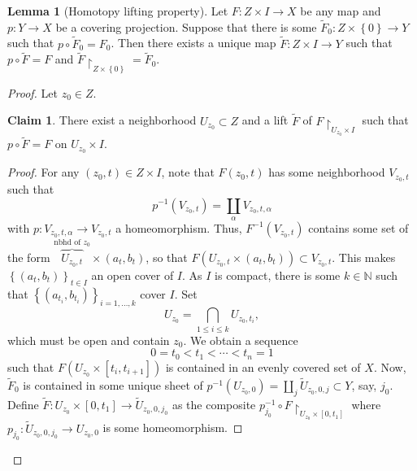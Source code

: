 \documentclass[10pt,letterpaper,cm]{nupset}
\theoremstyle{definition}
\theoremstyle{theorem}
\newtheorem{lemma}[definition]{Lemma}
\newtheorem*{claim}{Claim}
\theoremstyle{remark}
\newcommand{\N}{\mathbb N}
\newcommand{\1}{\mathbb{1}}
\newcommand{\0}{\vec 0}
\begin{document}
\begin{lemma}[Homotopy lifting property]\label{HLP}
Let $F : Z \times I \to X$ be any map and $p: Y \to X$ be a covering projection. Suppose that there is some $\widetilde{F}_0 : Z \times \left\{0\right\} \to Y$ such that $p \circ \widetilde{F}_0 = F_0$. Then there exists a unique map $\widetilde{F} : Z \times I \to Y$ such that $p \circ \widetilde{F} = F$ and $\widetilde{F} \restriction_{Z\times \left\{0\right\}} = \widetilde{F}_0$.
\end{lemma}
\begin{proof}
Let $z_0\in Z$.
\begin{claim} There exist a neighborhood $U_{z_0}\subset Z$ and a lift $\widetilde{F}$ of $F\restriction_{U_{z_0}\times I}$ such that $p \circ \widetilde{F} = F$ on $U_{z_0}\times I$.
\end{claim}
\begin{proof}
For any $\left(z_0, t\right) \in Z \times I$, note that $F(z_0, t)$ has some neighborhood $V_{z_0,t}$ such that $$p^{-1}(V_{z_0, t}) = \coprod_{\alpha} V_{z_0,t, \alpha}$$ with $p: V_{z_0, t, \alpha} \to V_{z_0, t}$ a homeomorphism. Thus, $F^{-1}(V_{z_0, t})$ contains some set of the form $\overbrace{U_{z_0, t}}^{\text{nbhd of } z_0} \times \left(a_t, b_t\right)$, so that $F(U_{z_0, t}  \times (a_t, b_t)) \subset V_{z_0, t} $. This makes $\left\{\left(a_t, b_t\right)\right\}_{t\in I}$ an open cover of $I$. As $I$ is compact, there is some $k\in \N$ such that $\left\{(a_{t_i}, b_{t_i})\right\}_{i=1, \ldots, k}$  cover $I$. Set $$U_{z_0} = \bigcap_{1\leq i \leq k} U_{z_0, t_i},$$ which must be  open and contain $z_0$. We obtain a sequence $$ 0= t_0 < t_1 < \cdots < t_n =1 $$ such that $F(U_{z_0} \times [t_i, t_{i+1}])$ is contained in an evenly covered set of $X$. 
Now, $\widetilde{F}_0 $ is contained in some unique sheet of $p^{-1}(U_{z_0, 0}) =\coprod_j \widetilde{U}_{z_0, 0, j} \subset Y$, say, $j_0$. Define $\widetilde{F} : U_{z_0} \times [0, t_1] \to \widetilde{U}_{z_0, 0, j_0}$ as the composite $p^{-1}_{j_0} \circ F \restriction_{U_{z_0} \times [0, t_1]}$ where $p_{j_0} : \widetilde{U}_{z_0, 0, j_0} \to U_{z_0, 0}$ is some homeomorphism.

\medskip


\end{proof}
\end{proof}
\end{document}
